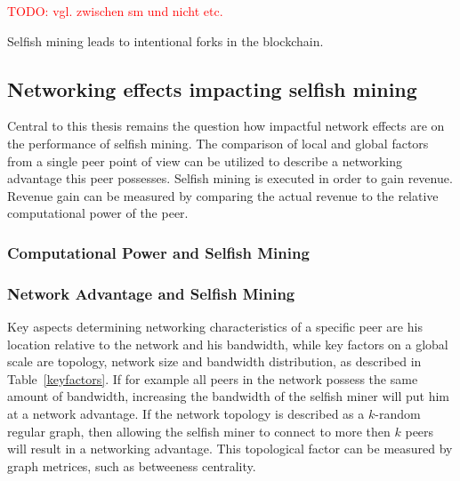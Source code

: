 \textcolor{red}{TODO: vgl. zwischen sm und nicht etc.}

Selfish mining leads to intentional forks in the blockchain.

  






\subsection{Networking effects impacting selfish mining}
Central to this thesis remains the question how impactful network effects are on the performance of selfish mining. The comparison of local and global factors from a single peer point of view can be utilized to describe a networking advantage this peer possesses.
Selfish mining is executed in order to gain revenue. Revenue gain can be measured by comparing the actual revenue to the relative computational power of the peer.
\subsubsection{Computational Power and Selfish Mining}


\subsubsection{Network Advantage and Selfish Mining}
Key aspects determining networking characteristics of a specific peer are his location relative to the network and his bandwidth, while key factors on a global scale are topology, network size and bandwidth distribution, as described in Table~\ref{keyfactors}. If for example all peers in the network possess the same amount of bandwidth, increasing the bandwidth of the selfish miner will put him at a network advantage.
If the network topology is described as a $k$-random regular graph, then allowing the selfish miner to connect to more then $k$ peers will result in a networking advantage. This topological factor can be measured by graph metrices, such as betweeness centrality.

